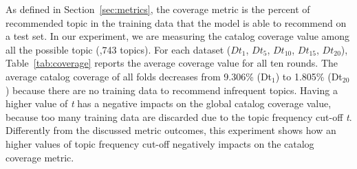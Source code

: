 As defined in Section~\ref{sec:metrics}, the coverage metric is the percent of recommended topic in the training data that the model is able to recommend on a test set. In our experiment, we are measuring the catalog coverage value among all the possible topic (,743 topics). For each dataset (\ie $Dt_{1}$, $Dt_{5}$, $Dt_{10}$, $Dt_{15}$, $Dt_{20}$),  Table~\ref{tab:coverage} reports the average coverage value for all ten rounds. 
The average catalog coverage of all folds decreases from 9.306\% (Dt$_1$) to 1.805\% (Dt$_{20}$) because there are no training data to recommend infrequent topics. 
Having a higher value of \emph{t} has a negative impacts on the global catalog coverage value, because too many training data are discarded due to the topic frequency cut-off \emph{t}. Differently from the discussed metric outcomes, this experiment shows how an higher values of topic frequency cut-off negatively impacts on the catalog coverage metric.

